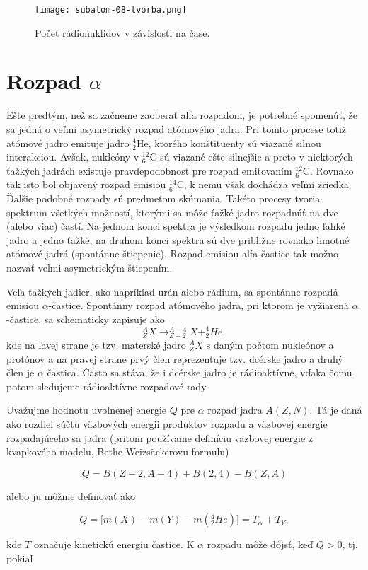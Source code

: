 \documentclass[../../main.tex]{subfiles}
\begin{document}
\begin{figure}[!h]
\texttt{[image: subatom-08-tvorba.png]}
\centering
\caption{Počet rádionuklidov v závislosti na čase.}
\label{sf8:fig:tvorba}
\end{figure}

\section{Rozpad $\alpha$}
Ešte predtým, než sa začneme zaoberať alfa rozpadom, je potrebné spomenúť, že sa jedná o veľmi asymetrický rozpad atómového jadra. Pri tomto procese totiž atómové jadro emituje jadro $_{2}^4$He, ktorého konštituenty sú viazané silnou interakciou. Avšak, nukleóny v $_{6}^{12}$C sú viazané ešte silnejšie a preto v niektorých ťažkých jadrách existuje pravdepodobnosť pre rozpad emitovaním $_{6}^{12}$C. Rovnako tak isto bol objavený rozpad emisiou $_{6}^{14}$C, k nemu však dochádza veľmi zriedka. Ďalšie podobné rozpady sú predmetom skúmania. Takéto procesy tvoria spektrum všetkých možností, ktorými sa môže ťažké jadro rozpadnúť na dve (alebo viac) častí. Na jednom konci spektra je výsledkom rozpadu jedno ľahké jadro a jedno ťažké, na druhom konci spektra sú dve približne rovnako hmotné atómové jadrá (spontánne štiepenie).
Rozpad emisiou alfa častice tak možno nazvať veľmi asymetrickým štiepením.

Veľa ťažkých jadier, ako napríklad urán alebo rádium, sa spontánne rozpadá emisiou $\alpha$-častice. Spontánny rozpad atómového jadra, pri ktorom je vyžiarená $\alpha$-častice, sa schematicky zapisuje ako
$$ _Z^AX \rightarrow _{Z-2}^{A-4}X + _2^4He, $$
kde na ľavej strane je tzv. materské jadro $_Z^AX$ s daným počtom nukleónov a protónov a na pravej strane prvý člen reprezentuje tzv. dcérske jadro a druhý člen je $\alpha$ častica. Často sa stáva, že i dcérske jadro je rádioaktívne, vďaka čomu potom sledujeme rádioaktívne rozpadové rady.

Uvažujme hodnotu uvoľnenej energie $Q$ pre $\alpha$ rozpad jadra $A(Z,N)$. Tá je daná ako rozdiel súčtu väzbových energii produktov rozpadu a väzbovej energie rozpadajúceho sa jadra (pritom používame definíciu väzbovej energie z kvapkového modelu, Bethe-Weizsäckerovu formulu)

$$ Q = B(Z-2, A-4)+B(2,4)-B(Z,A) $$

alebo ju môžme definovať ako 

$$ Q = \big[ m(X)-m(Y)-m(^4_2He) \big] = T_{\alpha} + T_Y, $$

kde $T$ označuje kinetickú energiu častice. K $\alpha$ rozpadu môže dôjsť, keď $Q>0$, tj. pokiaľ
\end{document}
